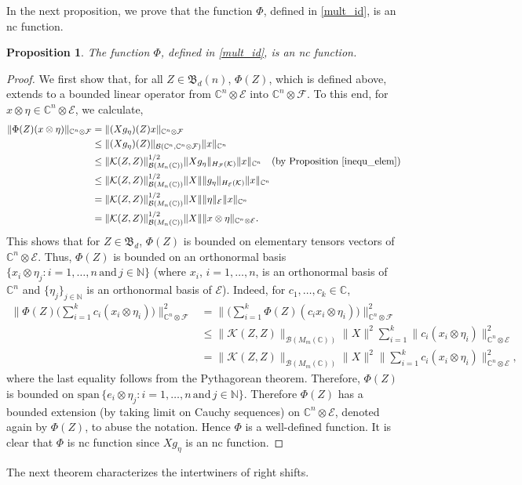 \documentclass[12pt]{amsart}%
\newtheorem{proposition}[theorem]{Proposition}
\numberwithin{equation}{section}
\newcommand{\bN}{\mathbb{N}}
\newcommand{\fB}{{\mathfrak{B}}}
\newcommand{\clb}{\mathcal{B}}
\newcommand{\cle}{\mathcal{E}}
\newcommand{\clf}{\mathcal{F}}
\newcommand{\clk}{\mathcal{K}}
\newcommand{\C}{\mathbb{C}}
\begin{document}
In the next proposition, we prove that the function $\Phi$, defined in \eqref{mult_id}, is an nc function.
\begin{proposition}
The function $\Phi$, defined in \eqref{mult_id}, is an nc function.
\end{proposition}
\begin{proof}
We first show that, for all $Z\in \fB_d(n)$, $\Phi(Z)$, which is defined above, extends to a bounded linear operator from $\C^n \otimes \cle$ into $\C^n \otimes \clf$. To this end, for $x\otimes \eta\in \C^n\otimes \cle$, we calculate,
\begingroup
 \allowdisplaybreaks
\begin{align*}
\|\Phi(Z)(x\otimes \eta)\|_{\C^n\otimes \clf}
&=\|(X g_\eta)(Z)x\|_{\C^n\otimes \clf}\\
&\leq\|(X g_\eta)(Z)\|_{\clb(\C^n, \C^n\otimes \clf)} \|x\|_{\C^n}\\
&\leq \|\clk(Z,Z)\|^{1/2}_{\clb (M_{n}(\C))} \|X g_\eta\|_{H_\clf(\clk)} \|x\|_{\C^n} \quad (\text{by Proposition  \ref{inequ_elem}})\\
&\leq \|\clk(Z,Z)\|^{1/2}_{\clb (M_{n}(\C))} \|X\| \| g_\eta\|_{H_\cle(\clk)} \|x\|_{\C^n} \\
&= \|\clk(Z,Z)\|^{1/2}_{\clb (M_{n}(\C))} \|X\| \| \eta\|_{\cle} \|x\|_{\C^n} \\
&= \|\clk(Z,Z)\|^{1/2}_{\clb (M_{n}(\C))} \|X\| \|x\otimes\eta\|_{\C^n\otimes \cle}. 
\end{align*}
\endgroup
This shows that for $Z\in \fB_d$, $\Phi(Z)$ is bounded on elementary tensors vectors of $\C^n \otimes \cle$. Thus, $\Phi(Z)$ is bounded on an orthonormal basis $\{x_i\otimes \eta_j: i=1,\ldots,n\, \text{and}\, j\in\bN\}$ (where $x_i$, $i=1,\ldots, n$, is an orthonormal basis of $\C^n$ and $\{\eta_j\}_{j\in\bN}$ is an  orthonormal basis of $\cle$). 
Indeed, for $c_1, \ldots, c_k\in \C$,
\begin{align*}
\Big\|\Phi(Z)\Big(\sum_{i=1}^k c_i(x_i\otimes\eta_i)\Big)\Big\|_{\C^n \otimes \clf}^2&=\Big\|\Big(\sum_{i=1}^k \Phi(Z)(c_i x_i\otimes\eta_i)\Big)\Big\|_{\C^n \otimes \clf}^2\\
&\leq \|\clk(Z,Z)\|_{\clb (M_{m}(\C))} \|X\|^2 \sum_{i=1}^k \|c_i (x_i\otimes\eta_i)\|_{\C^n \otimes \cle}^2\\
&= \|\clk(Z,Z)\|_{\clb (M_{m}(\C))} \|X\|^2 \Big\|\sum_{i=1}^k c_i( x_i\otimes\eta_i)\Big\|_{\C^n \otimes \cle}^2 ,
\end{align*}
where the last equality follows from the Pythagorean theorem. Therefore, $\Phi(Z)$ is bounded on $\text{span}\, \{e_i\otimes \eta_j: i=1,\ldots,n\, \text{and}\, j\in\bN\}$. Therefore $\Phi(Z)$ has a bounded extension (by taking limit on Cauchy sequences) on $\C^n\otimes\cle$, denoted again by $\Phi(Z)$, to abuse the notation.
Hence $\Phi$ is a well-defined function. It is clear that $\Phi$  is nc function since $Xg_\eta$ is an nc function.
\end{proof}
The next theorem characterizes the intertwiners of right shifts. 
\end{document}
